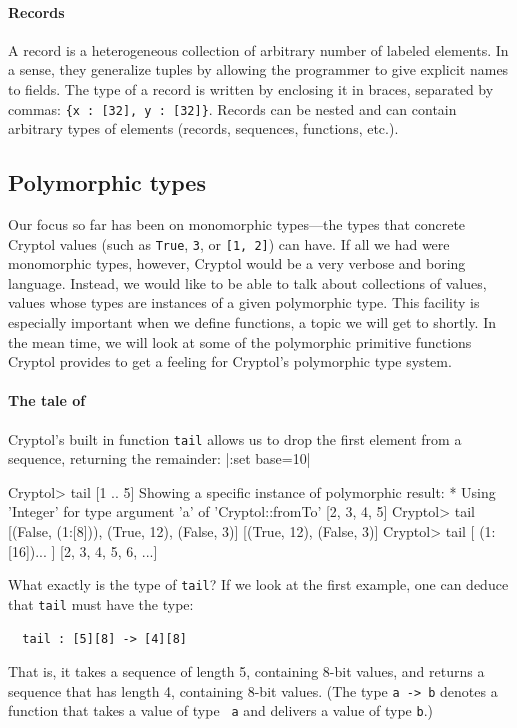 \paragraph{Records}\indTheRecordType
A record is a heterogeneous collection of arbitrary number of labeled
elements.  In a sense, they generalize tuples by allowing the
programmer to give explicit names to fields. The type of a record is
written by enclosing it in braces, separated by commas:
\texttt{\{x :\ [32], y :\ [32]\}}. Records can be nested and can contain arbitrary
types of elements (records, sequences, functions, etc.).

\subsection{Polymorphic types}\indPolymorphism
\label{sec:polymorphic-types}

Our focus so far has been on monomorphic types---the types that
concrete Cryptol values (such as {\tt True}, {\tt 3}, or {\tt [1, 2]})
can have.  If all we had were monomorphic types, however, Cryptol
would be a very verbose and boring language.  Instead, we would like
to be able to talk about collections of values, values whose types are
instances of a given polymorphic type. This facility is especially
important when we define functions, a topic we will get to shortly. In
the mean time, we will look at some of the polymorphic primitive
functions Cryptol provides to get a feeling for Cryptol's polymorphic
type system.

\paragraph{The tale of {}}\indTail
Cryptol's built in function {\tt tail} allows us to drop the first
element from a sequence, returning the remainder:
\restartrepl
\hidereplin|:set base=10|
\begin{replPrompt}
  Cryptol> tail [1 .. 5]
  Showing a specific instance of polymorphic result:
    * Using 'Integer' for type argument 'a' of 'Cryptol::fromTo'
  [2, 3, 4, 5]
  Cryptol> tail [(False, (1:[8])), (True, 12), (False, 3)]
  [(True, 12), (False, 3)]
  Cryptol> tail [ (1:[16])... ]
  [2, 3, 4, 5, 6, ...]
\end{replPrompt}
What exactly is the type of {\tt tail}? If we look at the first
example, one can deduce that {\tt tail} must have the type:
\begin{Verbatim}
  tail : [5][8] -> [4][8]
\end{Verbatim}
That is, it takes a sequence of length 5, containing 8-bit values, and
returns a sequence that has length 4, containing 8-bit values. (The
type {\tt a -> b} denotes a function that takes a value of type {\tt
  a} and delivers a value of type {\tt b}.)

